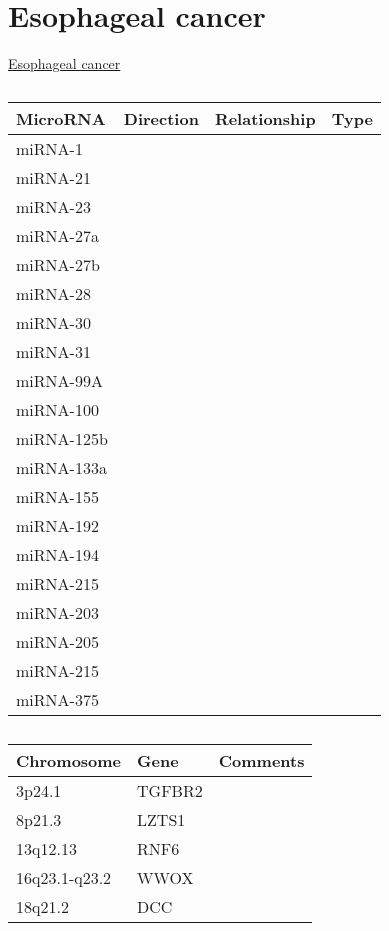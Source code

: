 
\section{Esophageal cancer}

\href{https://www.omim.org/entry/133239?search=Esophageal%20cancer&highlight=%28cancer%7Ccancerous%29%20esophageal}{Esophageal cancer}

\begin{table}[H]\centering
  \caption {\cite{key400} \cite{480}}
	\begin{tabular}{p{1cm}p{4cm}p{3cm}}
		 MicroRNA & Direction & Relationship & Type\\
		\hline
		miRNA-1 & & & \\
		miRNA-21 & & & \\
		miRNA-23 & & & \\
		miRNA-27a & & & \\
		miRNA-27b & & & \\
		miRNA-28 & & & \\
		miRNA-30 & & & \\
		miRNA-31 & & & \\
		miRNA-99A & & & \\
		miRNA-100 & & & \\
		miRNA-125b & & & \\
		miRNA-133a & & & \\
		miRNA-155 & & & \\
		miRNA-192 & & & \\
		miRNA-194 & & & \\
		miRNA-215 & & & \\
		miRNA-203 & & & \\
		miRNA-205 & & & \\
		miRNA-215 & & & \\
		miRNA-375 & & & \\
		\hline
	\end{tabular}
\end{table}




\begin{table}[H]\centering
  \caption {\cite{key450}}
	\begin{tabular}{p{1cm}p{4cm}p{3cm}}
		Chromosome & Gene & Comments\\
		\hline
3p24.1 & TGFBR2 & \\	
8p21.3 &  LZTS1 & \\
13q12.13 & RNF6 & \\	
16q23.1-q23.2 & WWOX & \\ 	
18q21.2 & DCC & \\
		\hline
	\end{tabular}
\end{table}


